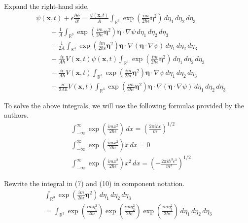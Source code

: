 \documentclass[12pt]{article}
\begin{document}
Expand the right-hand side.
\begin{align*}
&\psi(\mathbf{x},t)+\epsilon\frac{\partial\psi}{\partial t}
=\frac{\psi(\mathbf x,t)}{A}\int_{\mathbb R^3}
\exp\left(\frac{im}{2\hbar\epsilon}\boldsymbol\eta^2\right)
\,d\eta_1\,d\eta_2\,d\eta_3
\tag{7}
\\
&\qquad{}+\frac{1}{A}\int_{\mathbb R^3}
\exp\left(\frac{im}{2\hbar\epsilon}\boldsymbol\eta^2\right)
\boldsymbol\eta\cdot\nabla\psi
\,d\eta_1\,d\eta_2\,d\eta_3
\tag{8}
\\
&\qquad{}+\frac{1}{2A}\int_{\mathbb R^3}
\exp\left(\frac{im}{2\hbar\epsilon}\boldsymbol\eta^2\right)
\boldsymbol\eta\cdot\nabla(\boldsymbol\eta\cdot\nabla\psi)
\,d\eta_1\,d\eta_2\,d\eta_3
\tag{9}
\\
&\qquad{}-\frac{i\epsilon}{A\hbar}V\left(\mathbf x,t\right)\psi(\mathbf x,t)\int_{\mathbb R^3}
\exp\left(\frac{im}{2\hbar\epsilon}\boldsymbol\eta^2\right)
\,d\eta_1\,d\eta_2\,d\eta_3
\tag{10}
\\
&\qquad{}-\frac{i\epsilon}{A\hbar}V\left(\mathbf x,t\right)\int_{\mathbb R^3}
\exp\left(\frac{im}{2\hbar\epsilon}\boldsymbol\eta^2\right)
\boldsymbol\eta\cdot\nabla\psi
\,d\eta_1\,d\eta_2\,d\eta_3
\tag{11}
\\
&\qquad{}-\frac{i\epsilon}{2A\hbar}V\left(\mathbf x,t\right)\int_{\mathbb R^3}
\exp\left(\frac{im}{2\hbar\epsilon}\boldsymbol\eta^2\right)
\boldsymbol\eta\cdot\nabla(\boldsymbol\eta\cdot\nabla\psi)
\,d\eta_1\,d\eta_2\,d\eta_3
\tag{12}
\end{align*}

To solve the above integrals, we will use the following formulas provided by the authors.
\begin{align*}
&\int_{-\infty}^\infty\exp\left(\frac{imx^2}{2\hbar\epsilon}\right)\,dx
=\left(\frac{2\pi i\hbar\epsilon}{m}\right)^{1/2}
\tag{13}
\\
&\int_{-\infty}^\infty\exp\left(\frac{imx^2}{2\hbar\epsilon}\right)x\,dx
=0
\tag{14}
\\
&\int_{-\infty}^\infty\exp\left(\frac{imx^2}{2\hbar\epsilon}\right)x^2\,dx
=\left(-\frac{2\pi i\hbar^3\epsilon^3}{m^3}\right)^{1/2}
\tag{15}
\end{align*}

Rewrite the integral in (7) and (10) in component notation.
\begin{multline*}
\int_{\mathbb R^3}
\exp\left(\frac{im}{2\hbar\epsilon}\boldsymbol\eta^2\right)
\,d\eta_1\,d\eta_2\,d\eta_3
\\
{}=\int_{\mathbb R^3}
\exp\left(\frac{im\eta_1^2}{2\hbar\epsilon}\right)
\exp\left(\frac{im\eta_2^2}{2\hbar\epsilon}\right)
\exp\left(\frac{im\eta_3^2}{2\hbar\epsilon}\right)
\,d\eta_1\,d\eta_2\,d\eta_3
\end{multline*}
\end{document}
